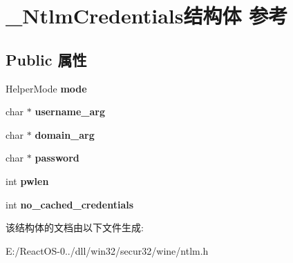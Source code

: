 \hypertarget{struct___ntlm_credentials}{}\section{\+\_\+\+Ntlm\+Credentials结构体 参考}
\label{struct___ntlm_credentials}
\subsection*{Public 属性}
\begin{DoxyCompactItemize}
\item 
\mbox{\label{struct___ntlm_credentials_a30cd1b3bf1ccb3d8c314864c87da8d21}} 
Helper\+Mode {\bfseries mode}
\item 
\mbox{\label{struct___ntlm_credentials_a39ea1762266bb561c54a7b0fd0bb4103}} 
char $\ast$ {\bfseries username\+\_\+arg}
\item 
\mbox{\label{struct___ntlm_credentials_a21217235559599e87e63533dad5dfbf3}} 
char $\ast$ {\bfseries domain\+\_\+arg}
\item 
\mbox{\label{struct___ntlm_credentials_a729ea6dc6260313726410565452989d6}} 
char $\ast$ {\bfseries password}
\item 
\mbox{\label{struct___ntlm_credentials_a4f0d56a365cc649d5fd4d1e6a3c08918}} 
int {\bfseries pwlen}
\item 
\mbox{\label{struct___ntlm_credentials_ae62079bb3d145812b0b9fdfce45c1d29}} 
int {\bfseries no\+\_\+cached\+\_\+credentials}
\end{DoxyCompactItemize}


该结构体的文档由以下文件生成\+:\begin{DoxyCompactItemize}
\item 
E\+:/\+React\+O\+S-\/0../dll/win32/secur32/wine/ntlm.\+h\end{DoxyCompactItemize}
